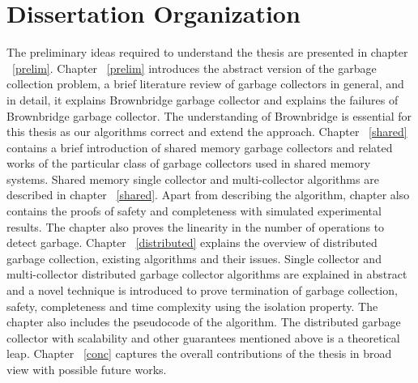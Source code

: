 \section{Dissertation Organization}
\label{intro:do}
The preliminary ideas required to understand the thesis are presented in chapter ~\ref{prelim}. Chapter ~\ref{prelim} introduces the abstract version of the garbage collection problem, a brief literature review of garbage collectors in general, and in detail, it explains Brownbridge garbage collector and explains the failures of Brownbridge garbage collector. The understanding of Brownbridge is essential for this thesis as our algorithms correct and extend the approach. Chapter ~\ref{shared} contains a brief introduction of shared memory garbage collectors and related works of the particular class of garbage collectors used in shared memory systems. Shared memory single collector and multi-collector algorithms are described in chapter ~\ref{shared}. Apart from describing the algorithm, chapter also contains the proofs of safety and completeness with simulated experimental results. The chapter also proves the linearity in the number of operations to detect garbage. Chapter ~\ref{distributed} explains the overview of distributed garbage collection, existing algorithms and their issues. Single collector and multi-collector distributed garbage collector algorithms are explained in abstract and a novel technique is introduced to prove termination of garbage collection, safety, completeness and time complexity using the isolation property. The chapter also includes the pseudocode of the algorithm. The distributed garbage collector with scalability and other guarantees mentioned above is a theoretical leap. Chapter ~\ref{conc} captures the overall contributions of the thesis in broad view with possible future works.
